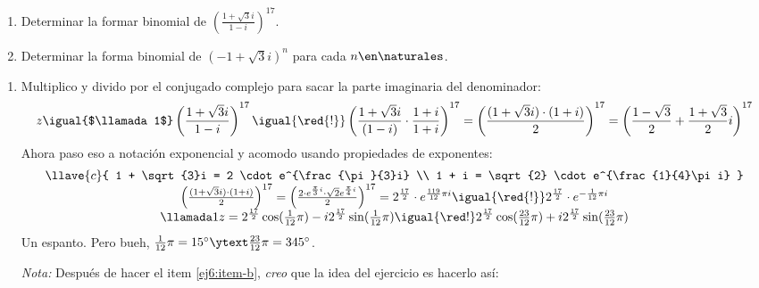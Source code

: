 \begin{enunciado}{\ejercicio}
  \begin{enumerate}[label=\alph*)]
    \item Determinar la formar binomial de
          $ \left(\frac{1 + \sqrt{3} i }{1 - i} \right)^{17}$.

    \item Determinar la forma binomial de
          $(-1 + \sqrt{3}i)^n$ para cada $n \en \naturales$.
  \end{enumerate}
\end{enunciado}

\begin{enumerate}[label=\alph*)]
  \item  Multiplico y divido por el conjugado complejo para sacar la parte imaginaria del denominador:
        $$
          z \igual{$\llamada1$} \left(\frac{1 + \sqrt{3} i }{1 - i} \right)^{17} \igual{\red{!}}
          \left(\frac{1 + \sqrt{3} i }{(1 - i)}\cdot \frac{1+i}{1+i} \right)^{17} =
          \left( \frac{(1 + \sqrt{3} i) \cdot (1+i) }{2} \right)^{17} =
          \left( \frac{1 - \sqrt{3}}{2} + \frac{1+\sqrt{3}}{2}i \right)^{17}
        $$
        Ahora paso eso a notación exponencial y acomodo usando propiedades de exponentes:
        $$
          \begin{array}{c}
            \llave{c}{
            1 + \sqrt{3}i = 2 \cdot e^{\frac{\pi}{3}i}     \\
              1 + i = \sqrt{2} \cdot e^{\frac{1}{4}\pi i}
            }                                              \\
            \left( \frac{(1 + \sqrt{3} i) \cdot (1+i) }{2} \right)^{17} =
            \left( \frac{{2 \cdot e^{\frac{\pi}{3}i} } \cdot \sqrt{2} e^{\frac{\pi}{4}i}}{2} \right)^{17} =
            2^{\frac{17}{2}} \cdot  e^{\frac{119}{12}\pi i}  \igual{\red{!}}
            2^{\frac{17}{2}} \cdot  e^{-\frac{1}{12}\pi i} \\
            \llamada1 z =
            2^{\frac{17}{2}}  \cos(\frac{1}{12} \pi) - i 2^{\frac{17}{2}} \sin(\frac{1}{12} \pi)
            \igual{\red!}
            2^{\frac{17}{2}}  \cos(\frac{23}{12} \pi) + i 2^{\frac{17}{2}} \sin(\frac{23}{12} \pi)
          \end{array}
        $$
        Un espanto. Pero bueh, $\frac{1}{12}\pi = 15^\circ \ytext \frac{23}{12} \pi = 345^\circ$.

        \medskip

        \textit{Nota:} Después de hacer el item \ref{ej6:item-b}, \textit{creo} que la idea del ejercicio es hacerlo así:


\end{enumerate}
